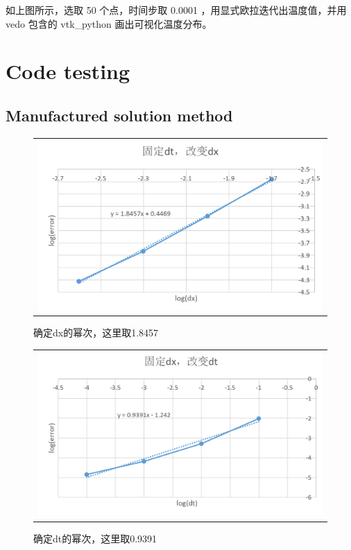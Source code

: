 \documentclass[3p]{elsarticle}
\numberwithin{equation}{section}
\begin{document}
    如上图所示，选取 50 个点，时间步取 0.0001 ，用显式欧拉迭代出温度值，并用 vedo 包含的 vtk\_python 画出可视化温度分布。
	
	\clearpage
	\section{Code testing}

	\subsection{Manufactured solution method}
	\begin{figure}[h]
		\begin{center}
			\begin{tabular}{c}
				\includegraphics[angle=0, scale=0.3]{./figures/dx_coff.png}
			\end{tabular}
		\end{center}
		\caption{确定dx的幂次，这里取1.8457}
		\label{fig:illustration-dx_coff}
	\end{figure}
	\begin{figure}[h]
		\begin{center}
			\begin{tabular}{c}
				\includegraphics[angle=0, scale=0.3]{./figures/dt_coff.png}
			\end{tabular}
		\end{center}
		\caption{确定dt的幂次，这里取0.9391}
		\label{fig:illustration-dt_coff}
	\end{figure}
\end{document}
